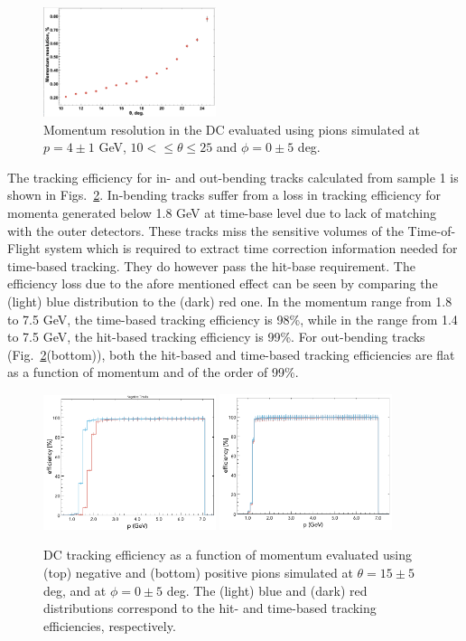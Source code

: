 \begin{figure}
\includegraphics[width=0.45\textwidth]{pics/DCRes2.png}
\caption{Momentum resolution in the DC evaluated using  pions  simulated at $p=4\pm 1$ GeV, $10<\leq \theta\leq 25$ and $\phi = 0 \pm 5$ deg.
}
\label{fig:restheta}
\end{figure}

The tracking efficiency for in- and out-bending tracks calculated from sample 1 is shown in  Figs.~\ref{fig:trkeff}.  In-bending tracks suffer from a loss in tracking efficiency for momenta generated below 1.8 GeV at time-base level due to lack of matching with the outer detectors.  These tracks miss the sensitive volumes of the Time-of-Flight system which is required to extract time correction information needed for time-based tracking.  They do however pass the hit-base requirement.  The efficiency loss due to the afore mentioned effect can be seen by comparing the (light) blue distribution to the (dark) red one.  In the momentum range from 1.8 to 7.5 GeV, the time-based tracking efficiency is 98\%, while in the range from 1.4 to 7.5 GeV, the hit-based tracking efficiency is 99\%.  For out-bending tracks (Fig.~\ref{fig:trkeff}(bottom)), both the hit-based and time-based tracking efficiencies are flat as a function of momentum and of the order of 99\%. 


\begin{figure}
\includegraphics[width=0.45\textwidth]{pics/DCTrkgEffNegTrks.png}
\includegraphics[width=0.45\textwidth]{pics/DCTrkgEffPosTrks.png}
\caption{DC tracking efficiency as a function of momentum evaluated using  (top) negative and (bottom) positive pions simulated at $\theta =15\pm 5$ deg, and at $\phi = 0 \pm 5$ deg. The (light) blue and (dark) red distributions correspond to the hit- and time-based tracking efficiencies, respectively.
}
\label{fig:trkeff}
\end{figure}


